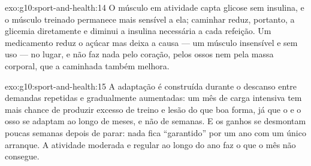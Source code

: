 \begin{solution}{exo:g10:sport-and-health:14}
O músculo em atividade capta glicose sem insulina, e o músculo treinado
permanece mais sensível a ela; caminhar reduz, portanto, a glicemia
diretamente e diminui a insulina necessária a cada refeição. Um
medicamento reduz o açúcar mas deixa a causa --- um músculo insensível
e sem uso --- no lugar, e não faz nada pelo coração, pelos ossos nem
pela massa corporal, que a caminhada também melhora.
\end{solution}

\begin{solution}{exo:g10:sport-and-health:15}
A adaptação é construída durante o descanso entre demandas repetidas e
gradualmente aumentadas: um mês de carga intensiva tem mais chance de
produzir excesso de treino e lesão do que boa forma, já que o  e o
osso se adaptam ao longo de meses, e não de semanas. E os ganhos se
desmontam poucas semanas depois de parar: nada fica ``garantido'' por
um ano com um único arranque. A atividade moderada e regular ao longo
do ano faz o que o mês não consegue.
\end{solution}

